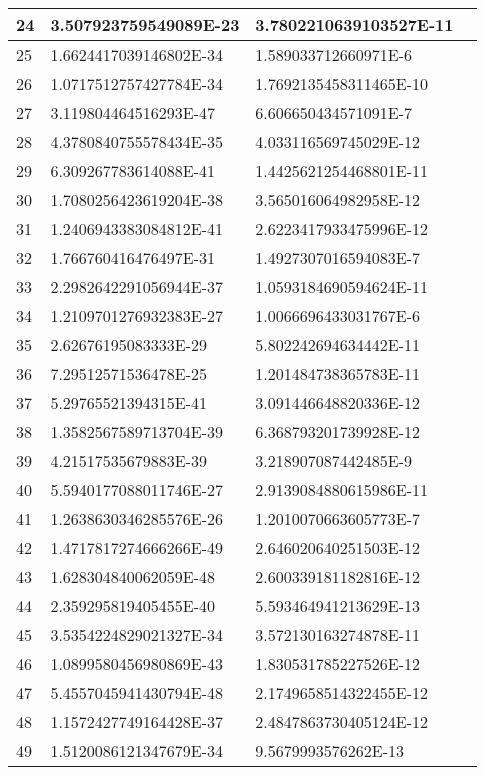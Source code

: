 \begin{center}
\begin{longtable}{ | l | l | l | l |}
24 &	3.507923759549089E-23 &	3.7802210639103527E-11 \\ \hline
25 &	1.6624417039146802E-34 &	1.589033712660971E-6 \\ \hline
26 &	1.0717512757427784E-34 &	1.7692135458311465E-10 \\ \hline
27 &	3.119804464516293E-47 &	6.606650434571091E-7 \\ \hline
28 &	4.3780840755578434E-35 &	4.033116569745029E-12 \\ \hline
29 &	6.309267783614088E-41 &	1.4425621254468801E-11 \\ \hline
30 &	1.7080256423619204E-38 &	3.565016064982958E-12 \\ \hline
31 &	1.2406943383084812E-41 &	2.6223417933475996E-12 \\ \hline
32 &	1.766760416476497E-31 &	1.4927307016594083E-7 \\ \hline
33 &	2.2982642291056944E-37 &	1.0593184690594624E-11 \\ \hline
34 &	1.2109701276932383E-27 &	1.0066696433031767E-6 \\ \hline
35 &	2.62676195083333E-29 &	5.802242694634442E-11 \\ \hline
36 &	7.29512571536478E-25 &	1.201484738365783E-11 \\ \hline
37 &	5.29765521394315E-41 &	3.091446648820336E-12 \\ \hline
38 &	1.3582567589713704E-39 &	6.368793201739928E-12 \\ \hline
39 &	4.21517535679883E-39 &	3.218907087442485E-9 \\ \hline
40 &	5.5940177088011746E-27 &	2.9139084880615986E-11 \\ \hline
41 &	1.2638630346285576E-26 &	1.2010070663605773E-7 \\ \hline
42 &	1.4717817274666266E-49 &	2.646020640251503E-12 \\ \hline
43 &	1.628304840062059E-48 &	2.600339181182816E-12 \\ \hline
44 &	2.359295819405455E-40 &	5.593464941213629E-13 \\ \hline
45 &	3.5354224829021327E-34 &	3.572130163274878E-11 \\ \hline
46 &	1.0899580456980869E-43 &	1.830531785227526E-12 \\ \hline
47 &	5.4557045941430794E-48 &	2.1749658514322455E-12 \\ \hline
48 &	1.1572427749164428E-37 &	2.4847863730405124E-12 \\ \hline
49 &	1.5120086121347679E-34 &	9.5679993576262E-13 \\ \hline

\end{longtable}
\end{center}
